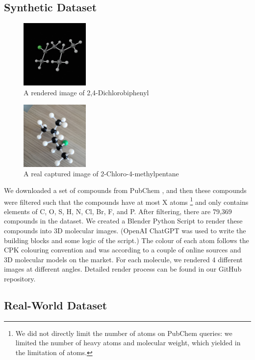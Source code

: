 \documentclass[conference]{IEEEtran}
\begin{document}
\subsection{Synthetic Dataset}
\begin{figure}
    \centering
    \includegraphics[width=0.3\textwidth]{generated}
    \caption{A rendered image of 2,4-Dichlorobiphenyl}
    \label{fig:enter-label}
\end{figure}
\begin{figure}
    \centering
    \includegraphics[width=0.3\textwidth]{cap}
    \caption{A real captured image of 2-Chloro-4-methylpentane}
    \label{fig:enter-label}
\end{figure}

We downloaded a set of compounds from PubChem \cite{kim_pubchem_2023}, and then these compounds were filtered such that the compounds have at most X atoms \footnote{We did not directly limit the number of atoms on PubChem queries: we limited the number of heavy atoms and molecular weight, which yielded in the limitation of atoms.} and only contains elements of C, O, S, H, N, Cl, Br, F, and P.
After filtering, there are 79,369 compounds in the dataset. We created a Blender Python Script to render these compounds into 3D molecular images. (OpenAI ChatGPT was used to write the building blocks and some logic of the script.) The colour of each atom follows the CPK colouring convention and was according to a couple of online sources and 3D molecular models on the market. For each molecule, we rendered 4 different images at different angles. Detailed render process can be found in our GitHub repository. 
\subsection{Real-World Dataset}
\end{document}
